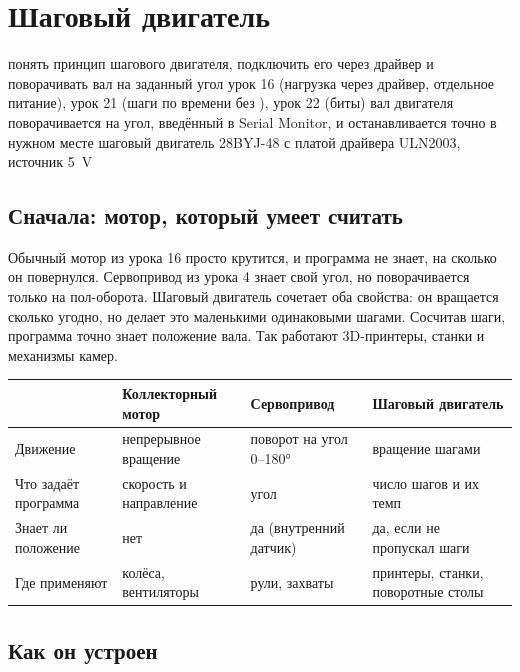 \section{Шаговый двигатель}
\lessonintro
  {понять принцип шагового двигателя, подключить его через драйвер и поворачивать вал на заданный угол}
  {урок 16 (нагрузка через драйвер, отдельное питание), урок 21 (шаги по времени без ), урок 22 (биты)}
  {вал двигателя поворачивается на угол, введённый в Serial Monitor, и останавливается точно в нужном месте}
  {шаговый двигатель 28BYJ-48 с платой драйвера ULN2003, источник \SI{5}{V}}

\subsection{Сначала: мотор, который умеет считать}

Обычный мотор из урока 16 просто крутится, и программа не знает, на сколько он повернулся. Сервопривод
из урока 4 знает свой угол, но поворачивается только на пол-оборота. Шаговый двигатель сочетает оба
свойства: он вращается сколько угодно, но делает это маленькими одинаковыми шагами. Сосчитав шаги,
программа точно знает положение вала. Так работают 3D-принтеры, станки и механизмы камер.

\begin{center}\small
\begin{tabularx}{\textwidth}{@{}l X X X@{}}
\toprule
 & Коллекторный мотор & Сервопривод & Шаговый двигатель \\
\midrule
Движение & непрерывное вращение & поворот на угол 0--180° & вращение шагами \\
Что задаёт программа & скорость и направление & угол & число шагов и их темп \\
Знает ли положение & нет & да (внутренний датчик) & да, если не пропускал шаги \\
Где применяют & колёса, вентиляторы & рули, захваты & принтеры, станки, поворотные столы \\
\bottomrule
\end{tabularx}
\end{center}

\subsection{Как он устроен}

